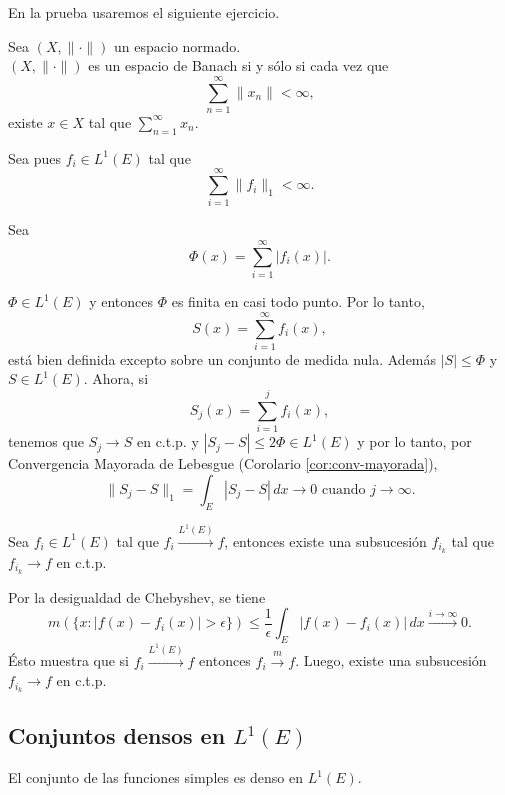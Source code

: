\begin{demo}
En la prueba 
usaremos el siguiente ejercicio.

\begin{ejercicio}{}
Sea $(X,\| \cdot\|)$ un espacio normado. \\
$(X,\| \cdot\|)$ es un espacio de Banach si y s\'olo si cada vez que 
\[
\sum\limits_{n=1}^{\infty} \|x_n\|<\infty,
\]
existe $x \in X$ tal que $\sum\limits_{n=1}^{\infty} x_n$.
\end{ejercicio}

Sea pues $f_i \in L^1(E)$ tal que 
\[
\sum\limits_{i=1}^{\infty} \|f_i\|_1<\infty.
\]

Sea \[ \Phi(x)=\sum\limits_{i=1}^{\infty} |f_i(x)|.\]

$\Phi \in L^1(E)$ y entonces $\Phi$ es finita en casi todo punto. Por lo tanto, 
\[
S(x)=\sum\limits_{i=1}^{\infty} f_i(x),
\]
est\'a bien definida excepto sobre un conjunto de medida nula.
%
Adem\'as $|S|\leq \Phi$ y  $S\in L^1(E)$.
%
Ahora, si 
\[
S_j(x)=\sum\limits_{i=1}^j f_i(x),
\]
tenemos que $S_j \to S$ en c.t.p. y $|S_j-S|\leq 2\Phi \in L^1(E)$ y por lo tanto, por Convergencia Mayorada de Lebesgue (Corolario \ref{cor:conv-mayorada}), 
\[
\|S_j-S\|_1=\int_E |S_j-S|\,dx \to 0 \mbox{ cuando } j \to \infty.
\]
\end{demo}

\begin{teorema}{}
Sea $f_i \in L^1(E)$ tal que $f_i \xrightarrow{L^1(E)} f$, entonces existe una subsucesi\'on $f_{i_k}$ tal que $f_{i_k}\to f$ en c.t.p.
\end{teorema}

\begin{demo}
Por la desigualdad de Chebyshev, se tiene
\[
m(\{x:|f(x)-f_i(x)|>\epsilon \})\leq 
\frac{1}{\epsilon}\int_E |f(x)-f_i(x)|\,dx \xrightarrow{i \to \infty}0.
\]
\'Esto muestra que si $f_i \xrightarrow{L^1(E)} f$ entonces
$f_i \xrightarrow{m} f$.
Luego, existe una subsucesi\'on $f_{i_k}\to f$ en c.t.p.
\end{demo}

\subsection{Conjuntos densos en $L^1(E)$}

\begin{teorema}{}
El conjunto de las funciones simples es denso en $L^1(E)$.
\end{teorema}

